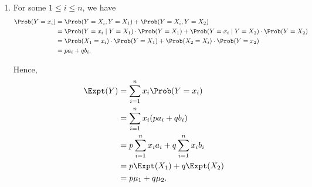 \Question{\currfilebase}

\begin{enumerate}
    \item For some \(1 \leq i \leq n\), we have
          \begin{align*}
              \Prob(Y = x_i) & = \Prob(Y = X_i, Y = X_1) + \Prob(Y = X_i, Y = X_2)                                                   \\
                             & = \Prob(Y = x_i \mid Y = X_1) \cdot \Prob(Y = X_1) + \Prob(Y = x_i \mid Y = X_2) \cdot \Prob(Y = X_2) \\
                             & = \Prob(X_1 = x_i) \cdot \Prob(Y = X_1) + \Prob(X_2 = X_i) \cdot \Prob(Y = x_2)                       \\
                             & = p a_i + q b_i.
          \end{align*}

          Hence,
          \begin{align*}
              \Expt(Y) & = \sum_{i = 1}^{n} x_i \Prob(Y = x_i)                     \\
                       & = \sum_{i = 1}^{n} x_i (p a_i + q b_i)                    \\
                       & = p \sum_{i = 1}^{n} x_i a_i + q \sum_{i = 1}^{n} x_i b_i \\
                       & = p \Expt(X_1) + q \Expt(X_2)                             \\
                       & = p \mu_1 + q \mu_2.
          \end{align*}


\end{enumerate}
